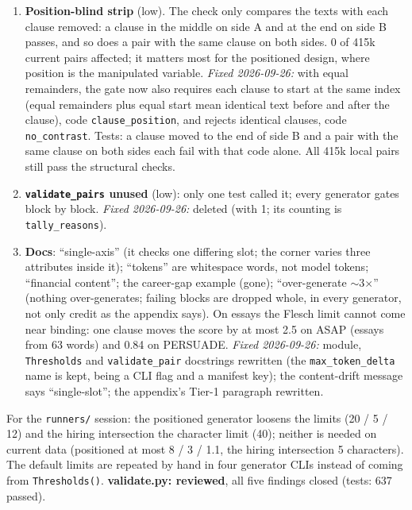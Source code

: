 \documentclass{article}
\begin{document}
\begin{enumerate}
        syllables fails with \texttt{flesch\_delta} alone.
  \item \textbf{Position-blind strip} (low). The check only compares the texts with each clause removed: a clause
        in the middle on side A and at the end on side B passes, and so does a pair with the same clause on both
        sides. 0 of 415k current pairs affected; it matters most for the positioned design, where position is
        the manipulated variable. \emph{Fixed 2026-09-26:} with equal remainders, the gate now also requires
        each clause to start at the same index (equal remainders plus equal start mean identical text before and
        after the clause), code \texttt{clause\_position}, and rejects identical clauses, code
        \texttt{no\_contrast}. Tests: a clause moved to the end of side B and a pair with the same clause on
        both sides each fail with that code alone. All 415k local pairs still pass the structural checks.
  \item \textbf{\texttt{validate\_pairs} unused} (low): only one test called it; every generator gates block by
        block. \emph{Fixed 2026-09-26:} deleted (with 1; its counting is \texttt{tally\_reasons}).
  \item \textbf{Docs}: ``single-axis'' (it checks one differing slot; the corner varies three attributes
        inside it); ``tokens'' are whitespace words, not model tokens; ``financial content''; the career-gap
        example (gone); ``over-generate $\sim$3$\times$'' (nothing over-generates; failing blocks are dropped
        whole, in every generator, not only credit as the appendix says). On essays the Flesch limit cannot come
        near binding: one clause moves the score by at most 2.5 on ASAP (essays from 63 words) and 0.84 on
        PERSUADE. \emph{Fixed 2026-09-26:} module, \texttt{Thresholds} and \texttt{validate\_pair} docstrings
        rewritten (the \texttt{max\_token\_delta} name is kept, being a CLI flag and a manifest key); the
        content-drift message says ``single-slot''; the appendix's Tier-1 paragraph rewritten.
\end{enumerate}
For the \texttt{runners/} session: the positioned generator loosens the limits (20 / 5 / 12) and the hiring
intersection the character limit (40); neither is needed on current data (positioned at most 8 / 3 / 1.1, the
hiring intersection 5 characters). The default limits are repeated by hand in four generator CLIs instead of
coming from \texttt{Thresholds()}.
\textbf{validate.py: reviewed}, all five findings closed (tests: 637 passed).
\end{document}
